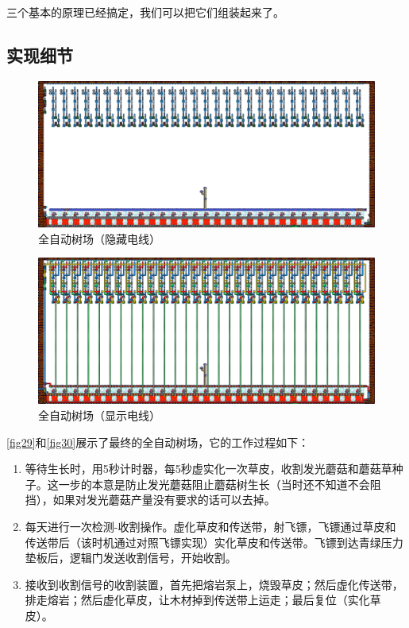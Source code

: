 三个基本的原理已经搞定，我们可以把它们组装起来了。

\subsection{实现细节}

\begin{figure}
\includegraphics[width=0.99\textheight]{images/393.png}
\caption{全自动树场（隐藏电线）}\label{fig29}
\end{figure}

\begin{figure}
\includegraphics[width=0.99\textheight]{images/394.png}
\caption{全自动树场（显示电线）}\label{fig30}
\end{figure}

\autoref{fig29}和\autoref{fig30}展示了最终的全自动树场，它的工作过程如下：
\begin{enumerate}
\item 等待生长时，用5秒计时器，每5秒虚实化一次草皮，收割发光蘑菇和蘑菇草种子。这一步的本意是防止发光蘑菇阻止蘑菇树生长（当时还不知道不会阻挡），如果对发光蘑菇产量没有要求的话可以去掉。
\item 每天进行一次检测-收割操作。虚化草皮和传送带，射飞镖，飞镖通过草皮和传送带后（该时机通过对照飞镖实现）实化草皮和传送带。飞镖到达青绿压力垫板后，逻辑门发送收割信号，开始收割。
\item 接收到收割信号的收割装置，首先把熔岩泵上，烧毁草皮；然后虚化传送带，排走熔岩；然后虚化草皮，让木材掉到传送带上运走；最后复位（实化草皮）。
\end{enumerate}

